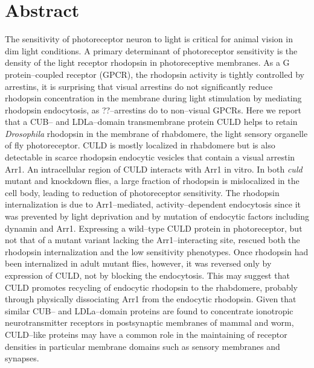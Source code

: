 \section{Abstract}
The sensitivity of photoreceptor neuron to light is critical for animal vision in dim light conditions. A primary determinant of photoreceptor sensitivity is the density of the light receptor rhodopsin in photoreceptive membranes. As a G protein--coupled receptor (GPCR), the rhodopsin activity is tightly controlled by arrestins, it is surprising that visual arrestins do not significantly reduce rhodopsin concentration in the membrane during light stimulation by mediating rhodopsin endocytosis, as ??--arrestins do to non--visual GPCRs. Here we report that a CUB-- and LDLa--domain transmembrane protein CULD helps to retain \textit{Drosophila} rhodopsin in the membrane of rhabdomere, the light sensory organelle of fly photoreceptor. CULD is mostly localized in rhabdomere but is also detectable in scarce rhodopsin endocytic vesicles that contain a visual arrestin Arr1. An intracellular region of CULD interacts with Arr1 in vitro. In both \textit{culd} mutant and knockdown flies, a large fraction of rhodopsin is mislocalized in the cell body, leading to reduction of photoreceptor sensitivity. The rhodopsin internalization is due to Arr1--mediated, activity--dependent endocytosis since it was prevented by light deprivation and by mutation of endocytic factors including dynamin and Arr1. Expressing a wild--type CULD protein in photoreceptor, but not that of a mutant variant lacking the Arr1--interacting site, rescued both the rhodopsin internalization and the low sensitivity phenotypes. Once rhodopsin had been internalized in adult mutant flies, however, it was reversed only by expression of CULD, not by blocking the endocytosis. This may suggest that CULD promotes recycling of endocytic rhodopsin to the rhabdomere, probably through physically dissociating Arr1 from the endocytic rhodopsin. Given that similar CUB-- and LDLa--domain proteins are found to concentrate ionotropic neurotransmitter receptors in postsynaptic membranes of mammal and worm, CULD--like proteins may have a common role in the maintaining of receptor densities in particular membrane domains such as sensory membranes and synapses. 

